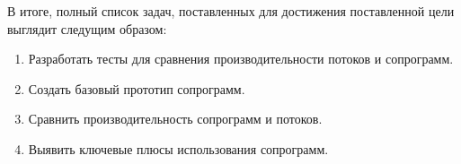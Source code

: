 	В итоге, полный список задач, поставленных для достижения поставленной цели выглядит следущим образом:
	\begin{enumerate}[align=left]
	  	\item Разработать тесты для сравнения производительности потоков и сопрограмм.
	  	\item Создать базовый прототип сопрограмм.
	  	\item Сравнить производительность сопрограмм и потоков.
	  	\item Выявить ключевые плюсы использования сопрограмм.
	\end{enumerate}
\clearpage